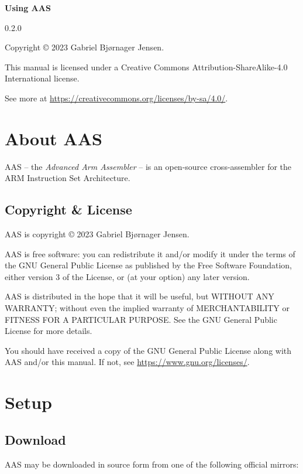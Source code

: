 \documentclass[a4paper]{article}
\title{\documenttitle}
\author{Gabriel Bjørnager Jensen}
\date{2023-12-31}
\newcommand{\aasmajor}{0}
\newcommand{\aasminor}{2}
\newcommand{\aaspatch}{0}
\newcommand{\documenttitle}{Using AAS}
\begin{document}
	\thispagestyle{empty}

	\vspace*{\fill}
	\begin{center}
		{\huge\bfseries\documenttitle}

		{\large\aasmajor.\aasminor.\aaspatch}
	\end{center}
	\vspace*{\fill}

	\clearpage
	\begin{center}
		Copyright © 2023 Gabriel Bjørnager Jensen.

		This manual is licensed under a Creative Commons Attribution-ShareAlike-4.0 International license.

		See more at \url{https://creativecommons.org/licenses/by-sa/4.0/}.
	\end{center}

	\clearpage
	\tableofcontents

	\clearpage
	\section{About AAS}
		AAS -- the \textit{Advanced Arm Assembler} -- is an open-source cross-assembler for the ARM Instruction Set Architecture.

		\subsection{Copyright \& License}
			AAS is copyright © 2023 Gabriel Bjørnager Jensen.

			AAS is free software: you can redistribute it and/or modify it under the terms of the GNU General Public License as published by the Free Software Foundation, either version 3 of the License, or (at your option) any later version.

			AAS is distributed in the hope that it will be useful, but WITHOUT ANY WARRANTY; without even the implied warranty of MERCHANTABILITY or FITNESS FOR A PARTICULAR PURPOSE. See the GNU General Public License for more details.

			You should have received a copy of the GNU General Public License along with AAS and/or this manual. If not, see \url{https://www.gnu.org/licenses/}.

	\clearpage
	\section{Setup}
		\subsection{Download}
			AAS may be downloaded in source form from one of the following official mirrors:
\end{document}
